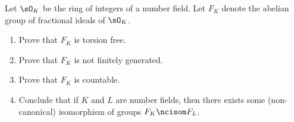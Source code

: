 \begin{exercise}
  Let $\sO_K$ be the ring of integers of a number field.
  Let $F_K$ denote the abelian group of fractional ideals of $\sO_K$.
  \begin{enumerate}[label=(\alph*)]
    \item Prove that $F_K$ is torsion free.
    \item Prove that $F_K$ is not finitely generated.
    \item Prove that $F_K$ is countable.
    \item Conclude that if $K$ and $L$ are number fields, then there
    exists some (non-canonical) isomorphism of groups $F_K \ncisom F_L$.
  \end{enumerate}
\end{exercise}

